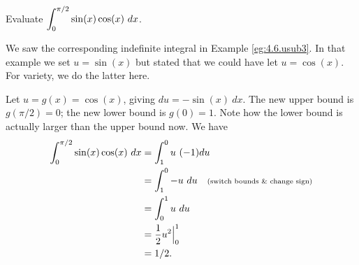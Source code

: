 \begin{example} \label{eg:4.6.sub8} 
Evaluate $\ds \int_0^{\pi/2} \sin(x) \cos(x) \ dx$.

\solution
We saw the corresponding indefinite integral in Example \ref{eg:4.6.usub3}. In that example we set $u = \sin(x)$ but stated that we could have let $u = \cos(x)$. For variety, we do the latter here.

Let $u = g(x) = \cos(x)$, giving $du = -\sin(x) \ dx$. The new upper bound is $g(\pi/2) = 0$; the new lower bound is $g(0) = 1$. Note how the lower bound is actually larger than the upper bound now. We have
\begin{align*}
\int_0^{\pi/2} \sin(x) \cos(x)\ dx &= \int_1^0 u \ (-1) du \\
&= \int_1^0 -u \ du \quad \text{\scriptsize (switch bounds \& change sign)}\\
&=	\int_0^1 u \ du\\
&= \frac{1}{2} u^2 \Big|_0^1\\
&= 1/2.
\end{align*}
\end{example}